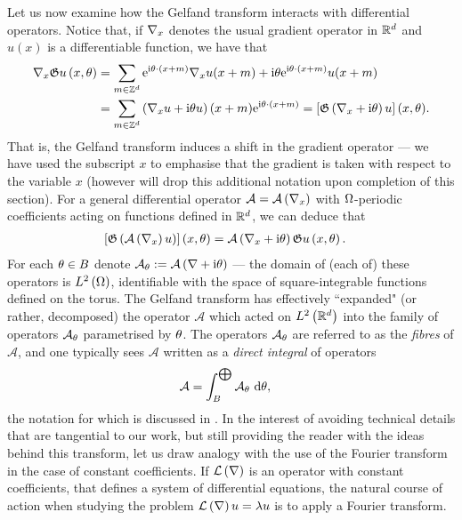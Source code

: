 Let us now examine how the Gelfand transform interacts with differential operators.
Notice that, if $\nabla_x$ denotes the usual gradient operator in $\mathbb{R}^d$ and $u(x)$ is a differentiable function, we have that
\begin{align*}
	\nabla_x\mathfrak{G} u\left( x,\theta \right) 
	&= \sum_{m\in\mathbb{Z}^d} \mathrm{e}^{\mathrm{i}\theta\cdot\left( x+m \right)}\nabla_x u(x+m) + \mathrm{i}\theta\mathrm{e}^{\mathrm{i}\theta\cdot\left( x+m \right)}u(x+m) \\
	&= \sum_{m\in\mathbb{Z}^d} \left( \nabla_x u + \mathrm{i}\theta u \right)(x+m)\mathrm{e}^{\mathrm{i}\theta\cdot\left( x+m \right)}
	= \left[ \mathfrak{G}\left( \nabla_x+\mathrm{i}\theta \right)u \right](x,\theta).
\end{align*}
That is, the Gelfand transform induces a shift in the gradient operator --- we have used the subscript $x$ to emphasise that the gradient is taken with respect to the variable $x$ (however will drop this additional notation upon completion of this section).
For a general differential operator $\mathcal{A} = \mathcal{A}\left( \nabla_x \right)$ with $\Omega$-periodic coefficients acting on functions defined in $\mathbb{R}^d$, we can deduce that
\begin{align*}
	\left[ \mathfrak{G}\left( \mathcal{A}\left( \nabla_x \right)u \right) \right](x,\theta) 
	&= \mathcal{A}\left( \nabla_x + \mathrm{i}\theta \right)\mathfrak{G} u\left( x,\theta \right).
\end{align*}
For each $\theta\in B$ denote $\mathcal{A}_{\theta}:=\mathcal{A}\left( \nabla+\mathrm{i}\theta \right)$ --- the domain of (each of) these operators is $L^2\left( \Omega \right)$, identifiable with the space of square-integrable functions defined on the torus.
The Gelfand transform has effectively ``expanded" (or rather, decomposed) the operator $\mathcal{A}$ which acted on $L^2\left( \mathbb{R}^d \right)$ into the family of operators $\mathcal{A}_{\theta}$ parametrised by $\theta$.
The operators $\mathcal{A}_{\theta}$ are referred to as the \emph{fibres} of $\mathcal{A}$, and one typically  sees $\mathcal{A}$ written as a \emph{direct integral} of operators
\begin{align*}
	\mathcal{A} &= \int_{B}^{\bigoplus}\mathcal{A}_{\theta} \ \mathrm{d}\theta,
\end{align*}
the notation for which is discussed in \cite{reed1978iv}.
In the interest of avoiding technical details that are tangential to our work, but still providing the reader with the ideas behind this transform, let us draw analogy with the use of the Fourier transform in the case of constant coefficients.
If $\mathcal{L}\left( \nabla \right)$ is an operator with constant coefficients, that defines a system of differential equations, the natural course of action when studying the problem $\mathcal{L}\left( \nabla \right)u=\lambda u$ is to apply a Fourier transform.
